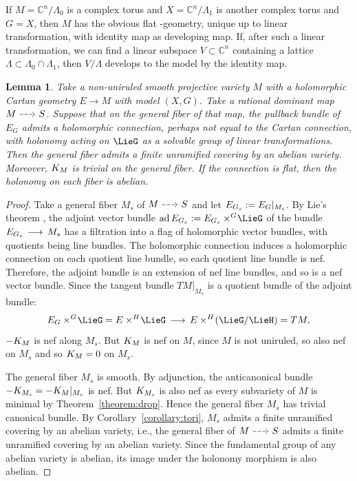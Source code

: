 \documentclass[11pt]{article}
\numberwithin{equation}{section}
\providecommand{\C}{\mathbb{C}}
\numberwithin{equation}{section}
\newtheorem{Lemma}[Theorem]{Lemma}
\renewcommand{\C}{\mathbb{C}}
\DeclareMathOperator{\ad}{ad}
\newcommand{\amal}[3]{\ensuremath{{#1} \mathbin{\times^{#2}} \! #3}}
\begin{document}
\begin{Example}
If $M = \C^{n}/\Lambda_0$ is a complex torus and $X = \C^{n}/\Lambda_1$ is another complex torus and $G = X$, then $M$ has the obvious flat -geometry, unique up to linear transformation, with identity map as developing map.
If, after such a linear transformation, we can find a linear subspace $V \subset \C^{n}$ containing a
lattice $\Lambda \subset \Lambda_0 \cap \Lambda_1$, then $V/\Lambda$ develops to the model by the identity map.
\end{Example}

\begin{Lemma}\label{lemma:abelian.pancake}
Take a non-uniruled smooth projective variety $M$ with a holomorphic Cartan geometry $E \to M$ with model $(X, G)$.
Take a rational dominant map $\rationalMap{M}{S}$.
Suppose that on the general fiber of that map, the pullback bundle of $E_G$ admits a holomorphic connection, perhaps not equal to the Cartan connection, with holonomy acting on $\LieG$ as a solvable group of linear transformations.
Then the general fiber admits a finite unramified covering by an abelian variety.
Moreover, $\cb{M}$ is trivial on the general fiber.
If the connection is flat, then the holonomy on each fiber is abelian.
\end{Lemma}

\begin{proof}
Take a general fiber $M_{s} $ of $\rationalMap{M}{S}$ and let $E_{G_{\rm s} } := E_G|_{M_{s} }$.
By Lie's theorem \cite[Theorem 3]{Serre:2001}, the adjoint vector bundle $\ad{E_{G_{\rm s} }} := \amal{E_{G_{\rm s}}}{G}{\LieG}$ of the bundle $E_{G_{\rm s} }
\to M_{s} $ has a filtration into a flag of holomorphic vector bundles, with quotients being line bundles.
The holomorphic connection induces a holomorphic connection on each quotient line bundle, so each quotient line bundle is nef.
Therefore, the adjoint bundle is an extension of nef line bundles, and so is a nef vector bundle.
Since the tangent bundle $TM|_{M_{s} }$ is a quotient bundle of the adjoint bundle:
\[
\amal{E_G}{G}{\LieG} = \amal{E}{H}{\LieG} \to \amal{E}{H}{\pr{\LieG/\LieH}} = TM,
\]
$\acb{M}$ is nef along $M_{s} $.
But $\cb{M}$ is nef on $M$, since $M$ is not uniruled, so also nef on $M_{s} $ and so $\cb{M} = 0$ on $M_{s} $.

The general fiber $M_{s} $ is smooth.
By adjunction, the anticanonical bundle $\acb{M_{s}} = - \cb{M} |_{M_{s}}$ is nef.
But $\cb{M_{s}}$ is also nef as every subvariety of $M$ is minimal by Theorem~\ref{theorem:drop}.
Hence the general fiber $M_{s}$ has trivial canonical bundle.
By Corollary~\ref{corollary:tori}, $M_{s}$ admits a finite unramified covering by an abelian variety, i.e., the general fiber of $\rationalMap{M}{S}$ admits a finite unramified covering by an abelian variety.
Since the fundamental group of any abelian variety is abelian, its image under the holonomy morphism is also abelian.
\end{proof}
\end{document}
